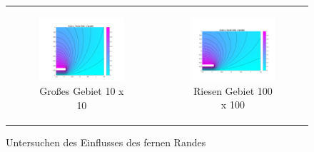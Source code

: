 \begin{figure}[ht]
\begin{tabular}{cc}
\begin{subfigure}{0.45\textwidth}
	\centering
	\includegraphics[width=\linewidth]{../Netgen/pdetool/pde-not-so-very-far}
	\caption{Großes Gebiet 10 x 10}
	\label{fig:pde-far}
\end{subfigure} &
\begin{subfigure}{0.45\textwidth}
	\centering
	\includegraphics[width=\linewidth]{../Netgen/pdetool/pde-very-far}
	\caption{Riesen Gebiet 100 x 100}
	\label{fig:pde-far}
\end{subfigure}
\end{tabular}
\caption{Untersuchen des Einflusses des fernen Randes}
\end{figure}